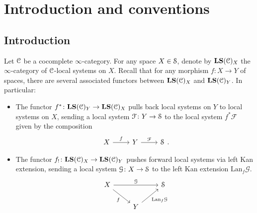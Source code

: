 \documentclass[main.tex]{subfiles}
\begin{document}
\section{Introduction and conventions}
\label{sec:introduction_and_conventions}

\subsection{Introduction}
\label{ssc:introduction}

Let $\category{C}$ be a cocomplete $\infty$-category. For any space $X \in \S$, denote by $\LS(\category{C})_{X}$ the $\infty$-category of $\category{C}$-local systems on $X$. Recall that for any morphism $f\colon X \to Y$ of spaces, there are several associated functors between $\LS(\category{C})_{X}$ and $\LS(\category{C})_{Y}$. In particular:
\begin{itemize}
  \item The functor $f^{*}\colon \LS(\category{C})_{Y} \to \LS(\category{C})_{X}$ pulls back local systems on $Y$ to local systems on $X$, sending a local system $\mathcal{F}\colon Y \to \S$ to the local system $f^{*}\mathcal{F}$ given by the composition
    \begin{equation*}
      \begin{tikzcd}
        X
        \arrow[r, "f"]
        & Y
        \arrow[r, "\mathcal{F}"]
        & \S
      \end{tikzcd}.
    \end{equation*}

  \item The functor $f_{!}\colon \LS(\category{C})_{X} \to \LS(\category{C})_{Y}$ pushes forward local systems via left Kan extension, sending a local system $\mathcal{G}\colon X \to \S$ to the left Kan extension $\mathrm{Lan}_{f}\mathcal{G}$.
    \begin{equation*}
      \begin{tikzcd}
        X
        \arrow[rr, "\mathcal{G}"]
        \arrow[dr, swap, "f"]
        && \S
        \\
        & Y
        \arrow[ur, swap, "\mathrm{Lan}_{f}\mathcal{G}"]
      \end{tikzcd}
    \end{equation*}
\end{itemize}
\end{document}

